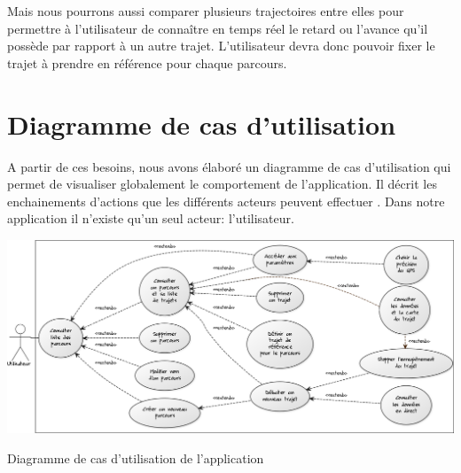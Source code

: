 Mais nous pourrons aussi comparer plusieurs trajectoires entre elles pour permettre à l'utilisateur de connaître en temps réel le retard ou l'avance qu'il possède par rapport à un autre trajet. L'utilisateur devra donc pouvoir fixer le trajet à prendre en référence pour chaque parcours.

\section{Diagramme de cas d'utilisation}
A partir de ces besoins, nous avons élaboré un diagramme de cas d'utilisation qui permet de visualiser globalement le comportement de l'application. Il décrit les enchainements d'actions que les différents acteurs peuvent effectuer . Dans notre application il n'existe qu'un seul acteur: l'utilisateur.
\begin{img}
  \includegraphics[scale=0.35]{img/DUC.png}
  \caption{Diagramme de cas d'utilisation de l'application}
\end{img}